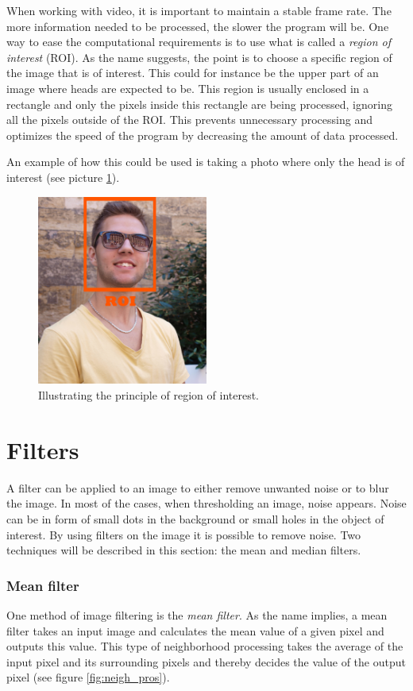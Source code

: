 When working with video, it is important to maintain a stable frame rate. The more information needed to be processed, the slower the program will be. One way to ease the computational requirements is to use what is called a \textit{region of interest} (ROI). As the name suggests, the point is to choose a specific region of the image that is of interest. This could for instance be the upper part of an image where heads are expected to be. This region is usually enclosed in a rectangle and only the pixels inside this rectangle are being processed, ignoring all the pixels outside of the ROI. This prevents unnecessary processing and optimizes the speed of the program by decreasing the amount of data processed.

An example of how this could be used is taking a photo where only the head is of interest (see picture \ref{fig:Region of Interest}).

\begin{figure}[htbp] 
\centering 
\includegraphics[width=0.5\textwidth]{Pictures/Theory/RegionOfInterest.jpg} 
\caption{Illustrating the principle of region of interest.} 
\label{fig:Region of Interest} 
\end{figure} 

\section{Filters}
A filter can be applied to an image to either remove unwanted noise or to blur the image. In most of the cases, when thresholding an image, noise appears. Noise can be in form of small dots in the background or small holes in the object of interest. By using filters on the image it is possible to remove noise. Two techniques will be described in this section: the mean and median filters.

\subsubsection{Mean filter}
One method of image filtering is the \textit{mean filter}. As the name implies, a mean filter takes an input image and calculates the mean value of a given pixel and outputs this value. This type of neighborhood processing takes the average of the input pixel and its surrounding pixels and thereby decides the value of the output pixel (see figure \ref{fig:neigh_pros}).

